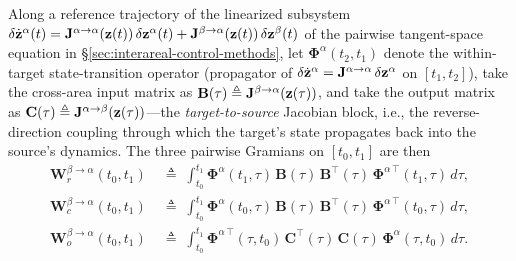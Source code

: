 Along a reference trajectory of the linearized subsystem $\delta\dot{\vb{z}}^{\alpha}(t)=\mathbf{J}^{\alpha\to\alpha}(\vb{z}(t))\,\delta\vb{z}^{\alpha}(t)+\mathbf{J}^{\beta\to\alpha}(\vb{z}(t))\,\delta\vb{z}^{\beta}(t)$ of the pairwise tangent-space equation in \S\ref{sec:interareal-control-methods}, let $\mathbf{\Phi}^{\alpha}(t_{2},t_{1})$ denote the within-target state-transition operator (propagator of $\delta\dot{\vb{z}}^{\alpha}=\mathbf{J}^{\alpha\to\alpha}\,\delta\vb{z}^{\alpha}$ on $[t_{1},t_{2}]$), take the cross-area input matrix as $\mathbf{B}(\tau)\triangleq\mathbf{J}^{\beta\to\alpha}(\vb{z}(\tau))$, and take the output matrix as $\mathbf{C}(\tau)\triangleq\mathbf{J}^{\alpha\to\beta}(\vb{z}(\tau))$---the \emph{target-to-source} Jacobian block, i.e., the reverse-direction coupling through which the target's state propagates back into the source's dynamics. The three pairwise Gramians on $[t_{0},t_{1}]$ are then
\begin{align}
\mathbf{W}_{r}^{\beta\to\alpha}(t_{0},t_{1}) &\;\triangleq\; \int_{t_{0}}^{t_{1}} \mathbf{\Phi}^{\alpha}(t_{1},\tau)\,\mathbf{B}(\tau)\,\mathbf{B}^{\!\top}(\tau)\,\mathbf{\Phi}^{\alpha\,\top}(t_{1},\tau)\,d\tau, \label{eq:supp-interareal-control-Wr-def}\\
\mathbf{W}_{c}^{\beta\to\alpha}(t_{0},t_{1}) &\;\triangleq\; \int_{t_{0}}^{t_{1}} \mathbf{\Phi}^{\alpha}(t_{0},\tau)\,\mathbf{B}(\tau)\,\mathbf{B}^{\!\top}(\tau)\,\mathbf{\Phi}^{\alpha\,\top}(t_{0},\tau)\,d\tau, \label{eq:supp-interareal-control-Wc-def}\\
\mathbf{W}_{o}^{\beta\to\alpha}(t_{0},t_{1}) &\;\triangleq\; \int_{t_{0}}^{t_{1}} \mathbf{\Phi}^{\alpha\,\top}(\tau,t_{0})\,\mathbf{C}^{\!\top}(\tau)\,\mathbf{C}(\tau)\,\mathbf{\Phi}^{\alpha}(\tau,t_{0})\,d\tau. \label{eq:supp-interareal-control-Wo-def}
\end{align}
